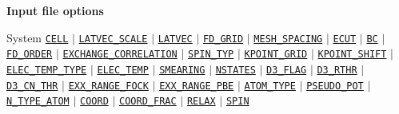   
  
  \begin{frame}[allowframebreaks]{\textbf{Input file options}} \label{Index}
  \vspace{-2mm}
  \begin{block}{System}
  \hyperlink{CELL}{\texttt{CELL}} $\vert$
  \hyperlink{LATVEC_SCALE}{\texttt{LATVEC\_SCALE}} $\vert$
  \hyperlink{LATVEC}{\texttt{LATVEC}}  $\vert$
  \hyperlink{FD_GRID}{\texttt{FD\_GRID}} $\vert$
  \hyperlink{MESH_SPACING}{\texttt{MESH\_SPACING}} $\vert$
  \hyperlink{ECUT}{\texttt{ECUT}} $\vert$
  \hyperlink{BC}{\texttt{BC}} $\vert$
  \hyperlink{FD_ORDER}{\texttt{FD\_ORDER}} $\vert$
  \hyperlink{EXCHANGE_CORRELATION}{\texttt{EXCHANGE\_CORRELATION}} $\vert$
  \hyperlink{SPIN_TYP}{\texttt{SPIN\_TYP}} $\vert$
  \hyperlink{KPOINT_GRID}{\texttt{KPOINT\_GRID}} $\vert$
  \hyperlink{KPOINT_SHIFT}{\texttt{KPOINT\_SHIFT}} $\vert$
  \hyperlink{ELEC_TEMP_TYPE}{\texttt{ELEC\_TEMP\_TYPE}} $\vert$
  \hyperlink{ELEC_TEMP}{\texttt{ELEC\_TEMP}} $\vert$
  \hyperlink{SMEARING}{\texttt{SMEARING}} $\vert$
  \hyperlink{NSTATES}{\texttt{NSTATES}}     $\vert$
  \hyperlink{D3_FLAG}{\texttt{D3\_FLAG}} $\vert$
  \hyperlink{D3_RTHR}{\texttt{D3\_RTHR}} $\vert$
  \hyperlink{D3_CN_THR}{\texttt{D3\_CN\_THR}} $\vert$
  \hyperlink{EXX_RANGE_FOCK}{\texttt{EXX\_RANGE\_FOCK}} $\vert$ 
  \hyperlink{EXX_RANGE_PBE}{\texttt{EXX\_RANGE\_PBE}} $\vert$ 
  \hyperlink{ATOM_TYPE}{\texttt{ATOM\_TYPE}} $\vert$
  \hyperlink{PSEUDO_POT}{\texttt{PSEUDO\_POT}}  $\vert$
  \hyperlink{N_TYPE_ATOM}{\texttt{N\_TYPE\_ATOM}} $\vert$
  \hyperlink{COORD}{\texttt{COORD}} $\vert$
  \hyperlink{COORD_FRAC}{\texttt{COORD\_FRAC}} $\vert$
  \hyperlink{RELAX}{\texttt{RELAX}} $\vert$
  \hyperlink{SPIN}{\texttt{SPIN}} 
  \end{block}
  

\end{frame}
